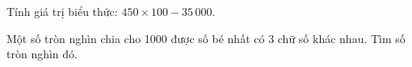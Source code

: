\begin{ex} %
Tính giá trị biểu thức: $450 \times 100 - 35\,000$.
\end{ex}

\begin{ex} %
Một số tròn nghìn chia cho 1000 được số bé nhất có 3 chữ số khác nhau. Tìm số tròn nghìn đó.
\end{ex}
